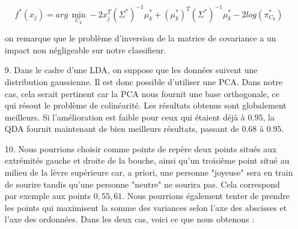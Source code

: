 \documentclass[a4paper, 10pt]{article}
\begin{document}
\begin{itemize}
\[ f^{*}(x_{j}) = arg \, \min_{C_{k}} - 2 x_{j}^{T} \left( \Sigma^{*} \right)^{-1} \mu_{k}^{*} + \left( \mu_{k}^{*} \right)^{T} \left( \Sigma^{*} \right)^{-1} \mu_{k}^{*} - 2 log \left( \pi_{C_{k}}^{*} \right) \]

on remarque que le problème d'inversion de la matrice de covariance a un impact non négligeable sur notre classifieur. \\

	\item[9.] Dans le cadre d'une LDA, on suppose que les données suivent une distribution gaussienne. Il est donc possible d'utiliser une PCA. Dans notre cas, cela serait pertinent car la PCA nous fournit une base orthogonale, ce qui résout le problème de colinéarité. Les résultats obtenus sont globalement meilleurs. Si l'amélioration est faible pour ceux qui étaient déjà à $0.95$, la QDA fournit maintenant de bien meilleurs résultats, passant de $0.68$ à $0.95$. \\
	
	\item[10.] Nous pourrions choisir comme points de repère deux points situés aux extrémités gauche et droite de la bouche, ainsi qu'un troisième point situé au milieu de la lèvre supérieure car, a priori, une personne "joyeuse" sera en train de sourire tandis qu'une personne "neutre" ne sourira pas. Cela correspond par exemple aux points $0, 55, 61$. Nous pourrions également tenter de prendre les points qui maximisent la somme des variances selon l'axe des abscisses et l'axe des ordonnées. Dans les deux cas, voici ce que nous obtenons : \\


\end{itemize}
\end{document}
